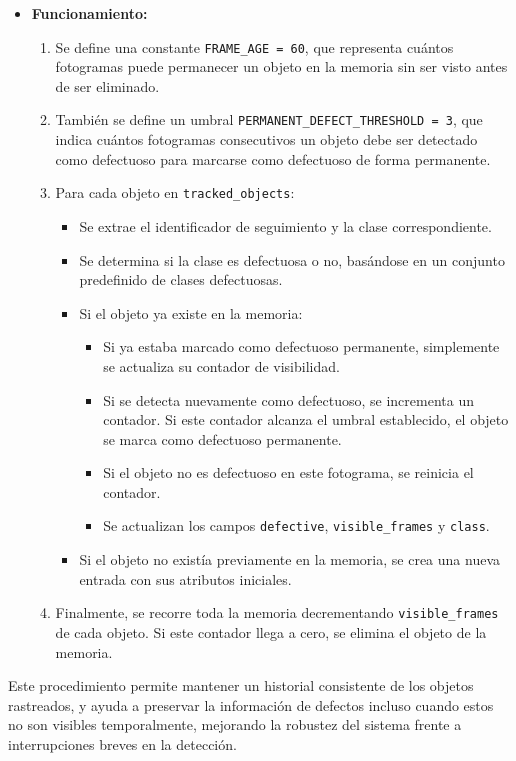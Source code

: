 \documentclass[11pt,spanish,listoffigures,listoftables]{tfgetsinf}
\begin{document}
\begin{itemize}
   \item \textbf{Funcionamiento:}
   \begin{enumerate}
      \item Se define una constante \texttt{FRAME\_AGE = 60}, que representa cuántos fotogramas puede permanecer un objeto en la memoria sin ser visto antes de ser eliminado.
      \item También se define un umbral \texttt{PERMANENT\_DEFECT\_THRESHOLD = 3}, que indica cuántos fotogramas consecutivos un objeto debe ser detectado como defectuoso para marcarse como defectuoso de forma permanente.
      \item Para cada objeto en \texttt{tracked\_objects}:
      \begin{itemize}
         \item Se extrae el identificador de seguimiento y la clase correspondiente.
         \item Se determina si la clase  es defectuosa o no, basándose en un conjunto predefinido de clases defectuosas.
         \item Si el objeto ya existe en la memoria:
         \begin{itemize}
            \item Si ya estaba marcado como defectuoso permanente, simplemente se actualiza su contador de visibilidad.
            \item Si se detecta nuevamente como defectuoso, se incrementa un contador. Si este contador alcanza el umbral establecido, el objeto se marca como defectuoso permanente.
            \item Si el objeto no es defectuoso en este fotograma, se reinicia el contador.
            \item Se actualizan los campos \texttt{defective}, \texttt{visible\_frames} y \texttt{class}.
         \end{itemize}
         \item Si el objeto no existía previamente en la memoria, se crea una nueva entrada con sus atributos iniciales.
      \end{itemize}
      \item Finalmente, se recorre toda la memoria decrementando \texttt{visible\_frames} de cada objeto. Si este contador llega a cero, se elimina el objeto de la memoria.
   \end{enumerate}
\end{itemize}

Este procedimiento permite mantener un historial consistente de los objetos rastreados, y ayuda a preservar la información de defectos incluso cuando estos no son visibles temporalmente, mejorando la robustez del sistema frente a interrupciones breves en la detección.
\end{document}
